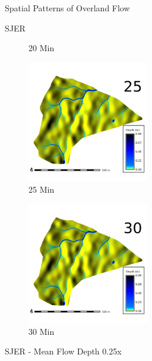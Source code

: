 \documentclass[
  ignorenonframetext,
]{beamer}
\begin{document}
\begin{frame}{Spatial Patterns of Overland Flow}
\begin{block}{SJER}
\begin{figure}[H]
{}

\caption{20 Min}

\end{figure}%

\begin{figure}[H]

{\centering \includegraphics[width=2.08333in,height=\textheight]{../output/SJER/sensitivity_1/SJER_depth_1_4_s_25_average.png}

}

\caption{25 Min}

\end{figure}%

\begin{figure}[H]

{\centering \includegraphics[width=2.08333in,height=\textheight]{../output/SJER/sensitivity_1/SJER_depth_1_4_s_30_average.png}

}

\caption{30 Min}

\end{figure}%
\end{block}

\begin{block}{SJER - Mean Flow Depth}
\label{sjer---mean-flow-depth}
0.25x

\begin{figure}[H]


\end{figure}
\end{block}
\end{frame}
\end{document}
